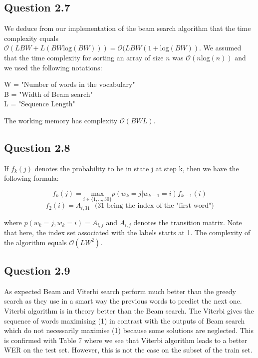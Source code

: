 \documentclass[9pt,twocolumn,letterpaper]{article}
\begin{document}
\subsection{Question 2.7}
We deduce from our implementation of the beam search algorithm that the time complexity equals $\mathcal{O}(LBW + L(BW\text{log}(BW))) = \mathcal{O}(LBW ( 1 + \text{log}(BW))$. We assumed that the time complexity for sorting an array of size $n$ was $\mathcal{O}(n\text{log}(n))$ and we used the following notations:
\begin{center}
W = "Number of words in the vocabulary"\\
[2mm]
B = "Width of Beam search"\\
[2mm]
L = "Sequence Length"
\end{center}
The working memory has complexity $\mathcal{O}(BWL).$

\subsection{Question 2.8}
If $f_{k}(j)$ denotes the probability to be in state j at step k, then we have the following formula:
\begin{center}
$$ f_{k}(j) = \underset{i \in \lbrace 1,...,30 \rbrace}{\text{max}}  p(w_{k} = j | w_{k-1} = i) f_{k-1}(i) $$
$$ f_{2}(i) = A_{i,31} \:\:\: \text{(31 being the index of the "first word")}  $$
\end{center}
where $p(w_{k} = j, w_{k} = i) = A_{i,j}$ and $A_{i,j}$ denotes the transition matrix. Note that here, the index set associated with the labels starts at 1. The complexity of the algorithm equals $\mathcal{O}(LW^{2})$.

\subsection{Question 2.9}
As expected Beam and Viterbi search perform much better than the greedy search as they use in a smart way the previous words to predict the next one. Viterbi algorithm is in theory better than the Beam search. The Viterbi gives the sequence of words maximising (1) in contrast with the outputs of Beam search which do not necessarily maximise (1) because some solutions are neglected. This is confirmed with Table 7 where we see that Viterbi algorithm leads to a better WER on the test set. However, this is not the case on the subset of the train set.
\end{document}
